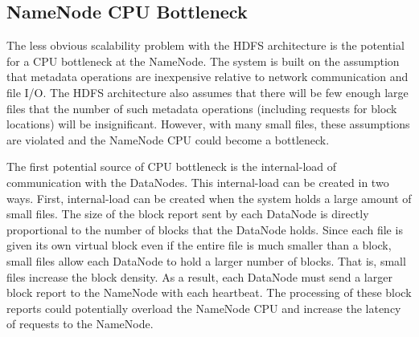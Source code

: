 \documentclass[11pt, a4paper]{article}
\begin{document}
\begin{multicols*}{2}
\subsection{NameNode CPU Bottleneck}
The less obvious scalability problem with the HDFS architecture is the potential for a CPU bottleneck at the NameNode. The system is built on the assumption that metadata operations are inexpensive relative to network communication and file I/O. The HDFS architecture also assumes that there will be few enough large files that the number of such metadata operations (including requests for block locations) will be insignificant. However, with many small files, these assumptions are violated and the NameNode CPU could become a bottleneck.


The first potential source of CPU bottleneck is the internal-load of communication with the DataNodes. This internal-load can be created in two ways. First, internal-load can be created when the system holds a large amount of small files. The size of the block report sent by each DataNode is directly proportional to the number of blocks that the DataNode holds. Since each file is given its own virtual block even if the entire file is much smaller than a block, small files allow each DataNode to hold a larger number of blocks. That is, small files increase the block density. As a result, each DataNode must send a larger block report to the NameNode with each heartbeat. The processing of these block reports could potentially overload the NameNode CPU and increase the latency of requests to the NameNode.


\end{multicols*}
\end{document}
